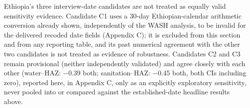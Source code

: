 Ethiopia's three interview-date candidates are not treated as equally valid sensitivity evidence. Candidate C1 uses a 30-day Ethiopian-calendar arithmetic conversion already shown, independently of the WASH analysis, to be invalid for the delivered recoded date fields (Appendix C); it is excluded from this section and from any reporting table, and its past numerical agreement with the other two candidates is not treated as evidence of robustness. Candidates C2 and C3 remain provisional (neither independently validated) and agree closely with each other (water--HAZ: −0.39 both; sanitation--HAZ: −0.45 both, both CIs including zero), reported here, in Appendix C, only as an explicitly exploratory sensitivity, never pooled into or compared against the established-date headline results above.
